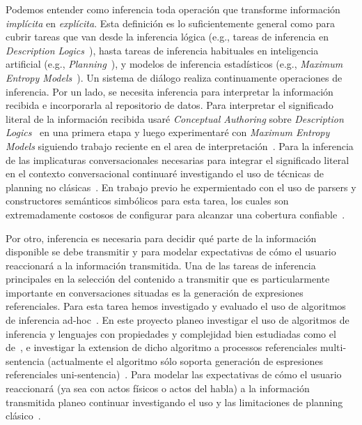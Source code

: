 \documentclass[11pt]{article}
\begin{document}
Podemos entender como inferencia toda operaci\'on que transforme informaci\'on
\emph{impl\'icita} en \emph{expl\'icita}.  Esta definici\'on es lo
suficientemente general como para cubrir tareas que van desde la inferencia
l\'ogica (e.g., tareas de inferencia en
\emph{Description Logics}~\citep{DBLP:conf/dlog/2003handbook}), hasta tareas de
inferencia habituales en inteligencia artificial (e.g.,
\emph{Planning}~\citep{nau04}), y modelos de inferencia estad\'isticos (e.g.,
\emph{Maximum Entropy Models}~\citep{berger96}). Un sistema de di\'alogo realiza
continuamente operaciones de inferencia. Por un lado, se necesita inferencia
para interpretar la informaci\'on recibida e incorporarla al repositorio de
datos. Para interpretar el significado literal de la informaci\'on recibida
usar\'e \emph{Conceptual Authoring} sobre \emph{Description
Logics}~\citep{piwek07} en una primera etapa y luego experimentar\'e con
\emph{Maximum Entropy Models} siguiendo trabajo
reciente en el area de interpretaci\'on~\citep{sagae09}. Para la
inferencia de las implicaturas conversacionales necesarias para integrar el
significado literal en el contexto conversacional continuar\'e investigando el
uso de t\'ecnicas de planning no
cl\'asicas~\citep{benotti08, benotti09a, benotti10}. En trabajo previo he
expermientado con el uso de parsers y constructores sem\'anticos simb\'olicos
para esta tarea, los cuales son extremadamente costosos de
configurar para alcanzar una cobertura confiable~\citep{benotti09b,benotti10}. 

Por otro, inferencia es necesaria para decidir qu\'e parte de la informaci\'on
disponible se debe transmitir y para modelar expectativas de c\'omo el usuario
reaccionar\'a a la informaci\'on transmitida. Una de las tareas de inferencia
principales en la selecci\'on del contenido a transmitir que es particularmente
importante en conversaciones situadas es la generaci\'on de expresiones
referenciales. Para esta tarea hemos investigado y evaluado el uso de algoritmos
de inferencia ad-hoc~\citep{amoia10}. En este proyecto planeo investigar el uso
de algoritmos de inferencia y lenguajes con propiedades y complejidad bien
estudiadas como el de~\cite{AKS08}, e investigar la extension de dicho
algoritmo a processos referenciales multi-sentencia (actualmente el algoritmo
s\'olo soporta generaci\'on de espresiones referenciales
uni-sentencia)~\citep{areces10,benotti10b}. Para modelar las expectativas de
c\'omo el usuario reaccionar\'a (ya sea con actos f\'isicos o actos del habla) a
la informaci\'on transmitida planeo continuar investigando el uso y las
limitaciones de planning cl\'asico~\citep{benotti09c}. 
\end{document}

